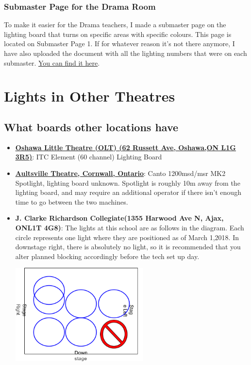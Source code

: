 \documentclass{article}
\begin{document}
\subsubsection{Submaster Page for the Drama Room}
To make it easier for the Drama teachers, I made a submaster page on the lighting board that turns on specific areas with specific colours. This page is located on Submaster Page 1. If for whatever reason it’s not there anymore, I have also uploaded the document with all the lighting numbers that were on each submaster. \href{https://hussein-esmail7.github.io/site/lighting/documents/Drama_room_submasters.docx}{\underline{You can find it here}}.

\section{Lights in Other Theatres}
\subsection{What boards other locations have}
\begin{itemize}
    \item \href{https://oshawalittletheatre.com}{\textbf{\underline{Oshawa Little Theatre (OLT) (62 Russett Ave, Oshawa,ON L1G 3R5)}}}: ITC Element (60 channel) Lighting Board
    \item \href{https://www.aultsvilletheatre.com/}{\textbf{\underline{Aultsville Theatre, Cornwall, Ontario}}}: Canto 1200msd/msr MK2 Spotlight, lighting board unknown. Spotlight is roughly 10m away from the lighting board, and may require an additional operator if there isn't enough time to go between the two machines.
    \item \textbf{J. Clarke Richardson Collegiate(1355 Harwood Ave N, Ajax, ONL1T 4G8)}: The lights at this school are as follows in the diagram. Each circle represents one light where they are positioned as of March 1,2018. In downstage right, there is absolutely no light, so it is recommended that you alter planned blocking accordingly before the tech set up day.
    \begin{center}
        \includegraphics[height=2in, width=\textwidth, keepaspectratio]{Richardson_Lighting.png}
    \end{center}
\end{itemize}
\end{document}
